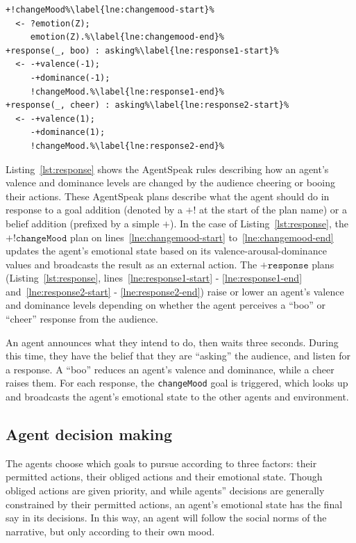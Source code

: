 \documentclass[11pt]{report}
\begin{document}
\begin{lstlisting}[float=!t,caption={AgentSpeak rules for changing an agent's
emotional values from audience
responses},label=lst:response,basicstyle=\scriptsize\ttfamily,escapechar=\%]
+!changeMood%\label{lne:changemood-start}%
  <- ?emotion(Z);
     emotion(Z).%\label{lne:changemood-end}%
+response(_, boo) : asking%\label{lne:response1-start}%
  <- -+valence(-1);
     -+dominance(-1);
     !changeMood.%\label{lne:response1-end}%
+response(_, cheer) : asking%\label{lne:response2-start}%
  <- -+valence(1);
     -+dominance(1);
     !changeMood.%\label{lne:response2-end}%
\end{lstlisting}

Listing~\ref{lst:response} shows the AgentSpeak rules describing how an agent's
valence and dominance levels are changed by the audience cheering or booing
their actions. These AgentSpeak plans describe what the agent should do in
response to a goal addition (denoted by a $\texttt{+!}$ at the start of the plan
name) or a belief addition (prefixed by a simple $\texttt{+}$). In the case of
Listing~\ref{lst:response}, the $\texttt{+!changeMood}$ plan on
lines~\ref{lne:changemood-start} to~\ref{lne:changemood-end} updates the agent's
emotional state based on its valence-arousal-dominance values and broadcasts the
result as an external action. The $\texttt{+response}$ plans
(Listing~\ref{lst:response}, lines~\ref{lne:response1-start} - \ref{lne:response1-end}
and~\ref{lne:response2-start} - \ref{lne:response2-end}) raise or lower an agent's valence and dominance levels depending on whether the agent perceives a ``boo'' or ``cheer'' response from the audience.

An agent announces what they intend to do, then waits three seconds. During this time, they have the belief that they are ``asking'' the audience, and listen for a response. A ``boo'' reduces an agent's valence and dominance, while a cheer raises them. For each response, the \texttt{changeMood} goal is triggered, which looks up and broadcasts the agent's emotional state to the other agents and environment.

\subsection{Agent decision making} \label{sec:decisions}
The agents choose which goals to pursue according to three factors: their permitted actions, their obliged actions and their emotional state. Though obliged actions are given priority, and while agents'' decisions are generally constrained by their permitted actions, an agent's emotional state has the final say in its decisions. In this way, an agent will follow the social norms of the narrative, but only according to their own mood.
\end{document}

